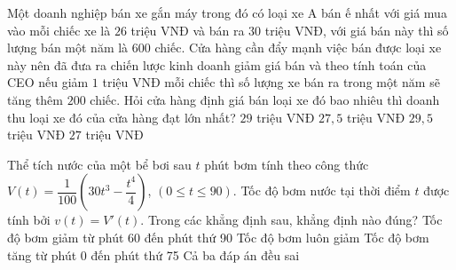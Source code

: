 \begin{ex}%
	Một doanh nghiệp bán xe gắn máy trong đó có loại xe A bán ế nhất với giá mua vào mỗi chiếc xe là $26$  triệu VNĐ và bán ra $30$ triệu VNĐ, với giá bán này thì số lượng bán một năm là $600$ chiếc. Cửa hàng cần đẩy mạnh việc bán được loại xe này nên đã đưa ra chiến lược kinh doanh giảm giá bán và theo tính toán của CEO nếu giảm $1$ triệu VNĐ mỗi chiếc thì số lượng xe bán ra trong một năm sẽ tăng thêm $200$ chiếc. Hỏi cửa hàng định giá bán loại xe đó bao nhiêu thì doanh thu loại xe đó của cửa hàng đạt lớn nhất?
	 \choice
		{$29$ triệu VNĐ} 
		{$27{,}5$ triệu  VNĐ}
		{\True $29{,}5$ triệu  VNĐ}
		{$27$ triệu VNĐ} 
\end{ex}

\begin{ex}%
	Thể tích nước của một bể bơi sau $t$ phút bơm tính theo công thức $V(t)=\dfrac{1}{100}\left(30t^3 - \dfrac{t^4}{4}\right)$,  $(0 \le t \le 90)$.
	Tốc độ bơm nước tại thời điểm $t$ được  tính bởi $v(t)=V'(t)$. Trong các khẳng định sau, khẳng định nào đúng?
	\choice 
		{Tốc độ bơm giảm từ phút 60 đến phút thứ  90}
		{Tốc  độ bơm luôn giảm}
		{Tốc độ bơm tăng từ phút 0 đến phút thứ  75}
		{\True Cả ba  đáp án đều sai}
\end{ex}

